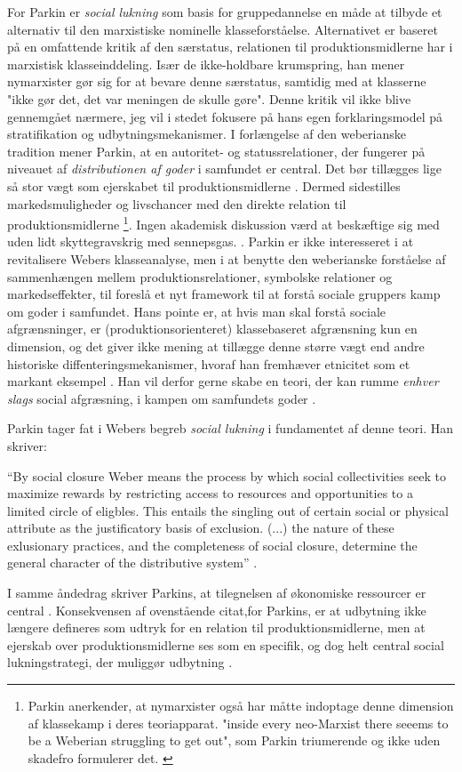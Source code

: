 For Parkin er \emph{social lukning} som basis for gruppedannelse en måde at tilbyde et alternativ til den marxistiske nominelle klasseforståelse. Alternativet er baseret på en omfattende kritik af den særstatus, relationen til produktionsmidlerne har i marxistisk klasseinddeling. Især de ikke-holdbare krumspring, han mener nymarxister gør sig for at bevare denne særstatus, samtidig med at klasserne "ikke gør det, det var meningen de skulle gøre". Denne kritik vil ikke blive gennemgået nærmere, jeg vil i stedet fokusere på hans egen forklaringsmodel på stratifikation og udbytningsmekanismer. I forlængelse af den weberianske tradition mener Parkin, at en autoritet- og statussrelationer, der fungerer på niveauet af \emph{distributionen af goder} i samfundet er central. Det bør tillægges lige så stor vægt som ejerskabet til produktionsmidlerne \parencite[24f]{Parkin1979}. Dermed sidestilles markedsmuligheder og livschancer med den direkte relation til produktionsmidlerne%
%
\footnote{Parkin anerkender, at nymarxister også har måtte indoptage denne dimension af klassekamp i deres teoriapparat. "inside every neo-Marxist there seeems to be a Weberian struggling to get out", som Parkin triumerende og ikke uden skadefro formulerer det. \parencite[25]{Parkin1979}}. Ingen akademisk diskussion værd at beskæftige sig med uden lidt skyttegravskrig med sennepsgas.%
%
. Parkin er ikke interesseret i at revitalisere Webers klasseanalyse, men i at benytte den weberianske forståelse af sammenhængen mellem produktionsrelationer, symbolske relationer og markedseffekter, til foreslå et nyt framework til at forstå sociale gruppers kamp om goder i samfundet. Hans pointe er, at hvis man skal forstå sociale afgrænsninger, er (produktionsorienteret) klassebaseret afgrænsning kun en dimension, og det giver ikke mening at tillægge denne større vægt end andre historiske diffenteringsmekanismer, hvoraf han fremhæver etnicitet som et markant eksempel \parencite[38f]{Parkin1979}. Han vil derfor gerne skabe en teori, der kan rumme \emph{enhver slags} social afgræsning, i kampen om samfundets goder \parencite[42]{Parkin1979}. 

Parkin tager fat i Webers begreb \emph{social lukning} i fundamentet af denne teori. Han skriver:
%
\begin{displayquote} “By social closure Weber means the process by which social collectivities seek to maximize rewards by restricting access to resources and opportunities to a limited circle of eligbles. This entails the singling out of certain social or physical attribute as the justificatory basis of exclusion. (...) the nature of these exlusionary practices, and the completeness of social closure, determine the general character of the distributive system” \parencite[44]{Parkin1979}. \end{displayquote}
%
I samme åndedrag skriver Parkins, at tilegnelsen af økonomiske ressourcer er central \parencite[44]{Parkin1979}. Konsekvensen af ovenstående citat,for Parkins, er at udbytning ikke længere defineres som udtryk for en relation til produktionsmidlerne, men at ejerskab over produktionsmidlerne ses som en specifik, og dog helt central social lukningstrategi, der muliggør udbytning \parencite[53]{Parkin1979}. 

